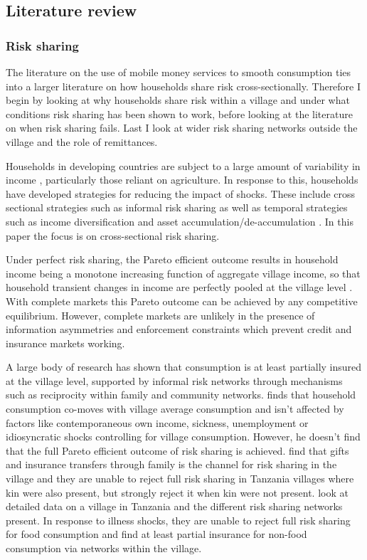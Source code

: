 \subsection{Literature review}


\subsubsection{Risk sharing}
The literature on the use of mobile money services to smooth consumption ties into a larger literature on how households share risk cross-sectionally. Therefore I begin by looking at why households share risk within a village and under what conditions risk sharing has been shown to work, before looking at the literature on when risk sharing fails. Last I look at wider risk sharing networks outside the village and the role of remittances. 

Households in developing countries are subject to a large amount of variability in income \citep{derconkrishnan1996}, particularly those reliant on agriculture. In response to this, households have developed strategies for reducing the impact of shocks. These include cross sectional strategies such as informal risk sharing as well as temporal strategies such as income diversification and asset accumulation/de-accumulation \citep{dercon2002}. In this paper the focus is on cross-sectional risk sharing.  

Under perfect risk sharing, the Pareto efficient outcome results in household income being a monotone increasing function of aggregate village income, so that household transient changes in income are perfectly pooled at the village level \citep{bardhanudry1999}. With complete markets this Pareto outcome can be achieved by any competitive equilibrium. However, complete markets are unlikely in the presence of information asymmetries and enforcement constraints which prevent credit and insurance markets working. 

A large body of research has shown that consumption is at least partially insured at the village level, supported by informal risk networks through mechanisms such as reciprocity within family and community networks. \cite{Townsend1994} finds that household consumption co-moves with village average consumption and isn't affected by factors like contemporaneous own income, sickness, unemployment or idiosyncratic shocks controlling for village consumption. However, he doesn't find that the full Pareto efficient outcome of risk sharing is achieved. \cite{chiappori2014} find that gifts and insurance transfers through family is the channel for risk sharing in the village and they are unable to reject full risk sharing in Tanzania villages where kin were also present, but strongly reject it when kin were not present. \cite{deweerdtdercon2006} look at detailed data on a village in Tanzania and the different risk sharing networks present. In response to illness shocks, they are unable to reject full risk sharing for food consumption and find at least partial insurance for non-food consumption via networks within the village.  

